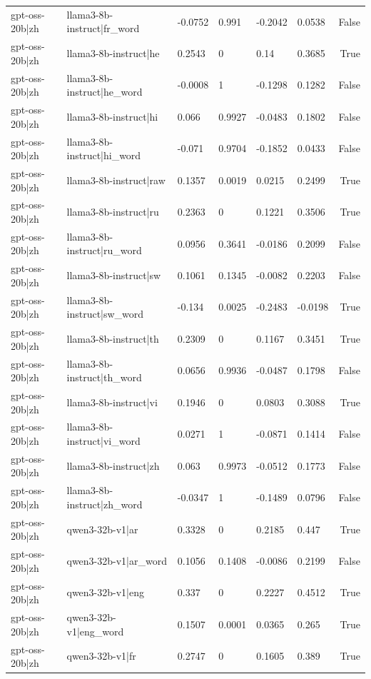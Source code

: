\begin{table}
\begin{tabular}{llllllr}
gpt-oss-20b|zh & llama3-8b-instruct|fr_word & -0.0752 & 0.991 & -0.2042 & 0.0538 & False \\
gpt-oss-20b|zh & llama3-8b-instruct|he & 0.2543 & 0 & 0.14 & 0.3685 & True \\
gpt-oss-20b|zh & llama3-8b-instruct|he_word & -0.0008 & 1 & -0.1298 & 0.1282 & False \\
gpt-oss-20b|zh & llama3-8b-instruct|hi & 0.066 & 0.9927 & -0.0483 & 0.1802 & False \\
gpt-oss-20b|zh & llama3-8b-instruct|hi_word & -0.071 & 0.9704 & -0.1852 & 0.0433 & False \\
gpt-oss-20b|zh & llama3-8b-instruct|raw & 0.1357 & 0.0019 & 0.0215 & 0.2499 & True \\
gpt-oss-20b|zh & llama3-8b-instruct|ru & 0.2363 & 0 & 0.1221 & 0.3506 & True \\
gpt-oss-20b|zh & llama3-8b-instruct|ru_word & 0.0956 & 0.3641 & -0.0186 & 0.2099 & False \\
gpt-oss-20b|zh & llama3-8b-instruct|sw & 0.1061 & 0.1345 & -0.0082 & 0.2203 & False \\
gpt-oss-20b|zh & llama3-8b-instruct|sw_word & -0.134 & 0.0025 & -0.2483 & -0.0198 & True \\
gpt-oss-20b|zh & llama3-8b-instruct|th & 0.2309 & 0 & 0.1167 & 0.3451 & True \\
gpt-oss-20b|zh & llama3-8b-instruct|th_word & 0.0656 & 0.9936 & -0.0487 & 0.1798 & False \\
gpt-oss-20b|zh & llama3-8b-instruct|vi & 0.1946 & 0 & 0.0803 & 0.3088 & True \\
gpt-oss-20b|zh & llama3-8b-instruct|vi_word & 0.0271 & 1 & -0.0871 & 0.1414 & False \\
gpt-oss-20b|zh & llama3-8b-instruct|zh & 0.063 & 0.9973 & -0.0512 & 0.1773 & False \\
gpt-oss-20b|zh & llama3-8b-instruct|zh_word & -0.0347 & 1 & -0.1489 & 0.0796 & False \\
gpt-oss-20b|zh & qwen3-32b-v1|ar & 0.3328 & 0 & 0.2185 & 0.447 & True \\
gpt-oss-20b|zh & qwen3-32b-v1|ar_word & 0.1056 & 0.1408 & -0.0086 & 0.2199 & False \\
gpt-oss-20b|zh & qwen3-32b-v1|eng & 0.337 & 0 & 0.2227 & 0.4512 & True \\
gpt-oss-20b|zh & qwen3-32b-v1|eng_word & 0.1507 & 0.0001 & 0.0365 & 0.265 & True \\
gpt-oss-20b|zh & qwen3-32b-v1|fr & 0.2747 & 0 & 0.1605 & 0.389 & True \\

\end{tabular}
\end{table}
